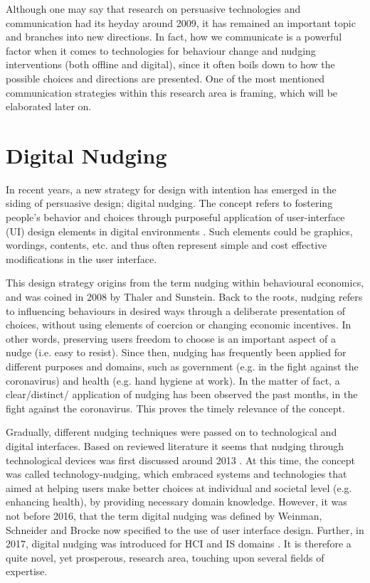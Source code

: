 Although one may say that research on persuasive technologies and communication had its heyday around 2009, it has remained an important topic and  branches into new directions. In fact, how we communicate is a powerful factor when it comes to technologies for behaviour change and nudging interventions (both offline and digital), since it often boils down to how the possible choices and directions are presented. One of the most mentioned communication strategies within this research area is framing, which will be elaborated  later on.

\section{Digital Nudging}
In recent years, a new strategy for design with intention has emerged in the siding of persuasive design; digital nudging. The concept refers to fostering people's behavior and choices through purposeful application of user-interface (UI) design elements in digital environments \cite{mirsch_making_2018}. Such elements could be graphics, wordings, contents, etc. and thus often represent simple and cost effective modifications in the user interface.

This design strategy origins from the term nudging within behavioural economics, and was coined in 2008 by Thaler and Sunstein\cite{thaler_nudge-_2009}. 
Back to the roots, nudging refers to influencing behaviours in desired ways through a deliberate presentation of choices, without using elements of coercion or changing economic incentives. In other words, preserving users freedom to choose is an important aspect of a nudge (i.e. easy to resist). Since then, nudging has frequently been applied for different purposes and domains, such as government (e.g. in the fight against the coronavirus) and health (e.g. hand hygiene at work). In the matter of fact, a clear/distinct/ application of nudging has been observed the past months, in the fight against the coronavirus. This proves the timely relevance of the concept. 

Gradually, different nudging techniques were passed on to technological and digital interfaces. Based on reviewed literature it seems that nudging through technological devices was first discussed around 2013 
\cite{thomas_nudging_2013}.
At this time, the concept was called technology-nudging, which embraced systems and technologies that aimed at helping users make better choices at individual and societal level (e.g. enhancing health), by providing necessary domain knowledge. However, it was not before 2016, that the term digital nudging was defined by Weinman, Schneider and Brocke \cite{weinmann_digital_2016}
now specified to the use of user interface design. Further, in 2017, digital nudging was introduced for HCI and IS domains
\cite{schneider_digital_2018}.
It is therefore a quite novel, yet prosperous, research area, touching upon several fields of expertise.

